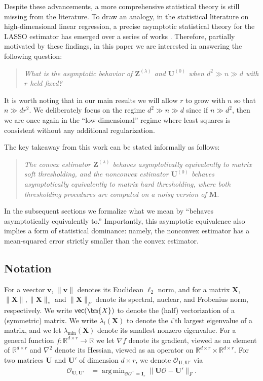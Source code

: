 \documentclass[10pt]{article}
\DeclareMathOperator*{\argmin}{arg\,min}
\renewcommand{\t}{^{\top}}
\theoremstyle{definition}
\begin{document}
 Despite these advancements, a more comprehensive statistical theory is still missing from the literature.  
 To draw an analogy, in the statistical literature on high-dimensional linear regression, 
 a precise asymptotic statistical theory for the LASSO estimator has emerged over a series of works \citep{bayati_lasso_2012,javanmard_confidence_2014,javanmard_debiasing_2018,bellec_debiasing_2023,celentano_lasso_2023,miolane_distribution_2021,thrampoulidis_precise_2018,thrampoulidis_regularized_2015}.  
 Therefore, partially motivated by these findings, in this paper we are interested in answering the following question:
 \begin{quote}
   \emph{What is the asymptotic behavior of $\bm{Z}^{(\lambda)}$ and $\bm{U}^{(0)}$ when $d^2 \gg n \gg d$ with $r$ held fixed?}
 \end{quote}
 It is worth noting that in our main results   we will allow $r$ to grow with $n$ so that $n \gg d r^2$.  We deliberately focus on the regime $d^2 \gg n \gg d$ since if $n \gg d^2$, then we are once again in the ``low-dimensional'' regime where least squares is consistent without any additional regularization.  


The key takeaway from this work can be stated informally as follows:
\begin{quote} 
\emph{The convex estimator $\bm{Z}^{(\lambda)}$ behaves asymptotically equivalently to matrix soft thresholding, and the nonconvex estimator $\bm{U}^{(0)}$ behaves asymptotically equivalently to matrix hard thresholding, where both thresholding procedures are computed on a noisy version of $\bm{M}$. }
\end{quote}
In the subsequent sections we formalize what we mean by ``behaves asymptotically equivalently to.''  Importantly, this asymptotic equivalence also implies a form of statistical dominance: namely, the nonconvex estimator has a mean-squared error strictly smaller than the convex estimator.




\subsection{Notation}
For a veector $\bm{v}$, $\|\bm{v}\|$ denotes its Euclidean $\ell_2$ norm, and for a matrix $\bm{X}$, $\|\bm{X}\|, \|\bm{X}\|_*$ and $\|\bm{X}\|_F$ denote its spectral, nuclear, and Frobenius norm, respectively.   We write ${\sf vec}(\bm{X})$ to denote the (half) vectorization of a (symmetric) matrix.     We write $\lambda_i(\bm{X})$ to denote the $i$'th largest eigenvalue of a matrix, and we let $\lambda_{\min}(\bm{X})$ denote its smallest nonzero eigenvalue.     For a general function $f: \mathbb{R}^{d \times r} \to \mathbb{R}$ we let $\nabla f$ denote its gradient, viewed as an element of $\mathbb{R}^{d \times r}$ and $\nabla^2$ denote its Hessian, viewed as an operator on $\mathbb{R}^{d\times r} \times \mathbb{R}^{d\times r}$. For two matrices $\bm{U}$ and $\bm{U}'$ of  dimension $d \times r$, we denote $\mathcal{O}_{\bm{U},\bm{U}'}$ via
\begin{align}
    \mathcal{O}_{\bm{U},\bm{U}'} &= \argmin_{\mathcal{OO}\t = \bm{I}_r} \| \bm{U} \mathcal{O} - \bm{U}' \|_F.
\end{align}
\end{document}
